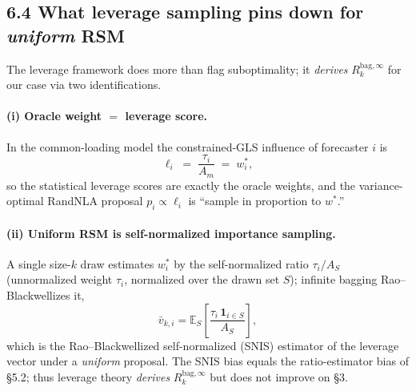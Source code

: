 \documentclass[11pt]{article}
\newcommand{\E}{\mathbb{E}}
\newcommand{\Rk}{R_k^{\mathrm{bag},\infty}}
\begin{document}
\subsection*{6.4 What leverage sampling pins down for \emph{uniform} RSM}

The leverage framework does more than flag suboptimality; it \emph{derives} $\Rk$ for our
case via two identifications.

\paragraph{(i) Oracle weight $=$ leverage score.}
In the common-loading model the constrained-GLS influence of forecaster $i$ is
\begin{equation}\label{eq:leverage-id}
  \ell_i \;=\; \frac{\tau_i}{A_m}\;=\;w_i^*,
\end{equation}
so the statistical leverage scores are exactly the oracle weights, and the
variance-optimal RandNLA proposal $p_i\propto\ell_i$ is ``sample in proportion to $w^*$.''

\paragraph{(ii) Uniform RSM is self-normalized importance sampling.}
A single size-$k$ draw estimates $w_i^*$ by the self-normalized ratio
$\tau_i/A_S$ (unnormalized weight $\tau_i$, normalized over the drawn set $S$);
infinite bagging Rao--Blackwellizes it,
\begin{equation}\label{eq:snis}
  \bar v_{k,i}=\E_S\!\left[\frac{\tau_i\,\mathbf 1_{i\in S}}{A_S}\right],
\end{equation}
which is the Rao--Blackwellized self-normalized (SNIS) estimator of the leverage
vector under a \emph{uniform} proposal. The SNIS bias equals the ratio-estimator bias of
\S5.2; thus leverage theory \emph{derives} $\Rk$ but does not improve on \S3.
\end{document}
